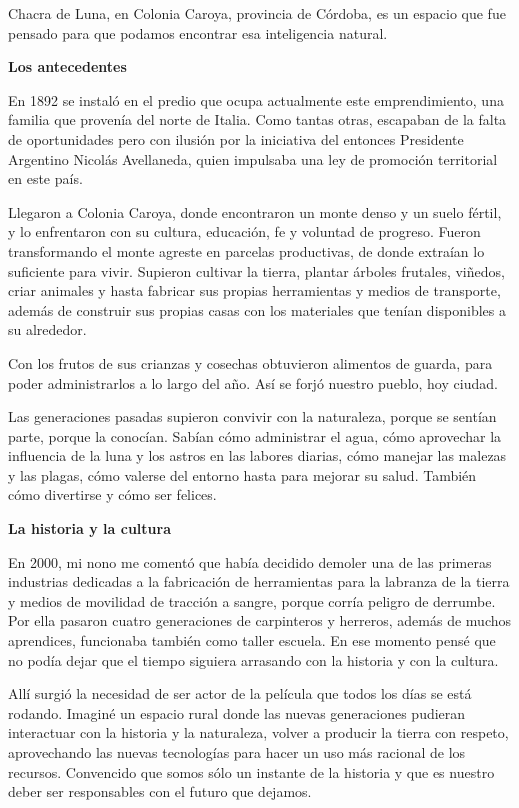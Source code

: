 Chacra de Luna, en Colonia Caroya, provincia de Córdoba, es un espacio
que fue pensado para que podamos encontrar esa inteligencia natural.

\textbf{Los antecedentes}

En 1892 se instaló en el predio que ocupa actualmente este
emprendimiento, una familia que provenía del norte de Italia. Como
tantas otras, escapaban de la falta de oportunidades pero con ilusión
por la iniciativa del entonces Presidente Argentino Nicolás Avellaneda,
quien impulsaba una ley de promoción territorial en este país.

Llegaron a Colonia Caroya, donde encontraron un monte denso y un suelo
fértil, y lo enfrentaron con su cultura, educación, fe y voluntad de
progreso. Fueron transformando el monte agreste en parcelas productivas,
de donde extraían lo suficiente para vivir. Supieron cultivar la tierra,
plantar árboles frutales, viñedos, criar animales y hasta fabricar sus
propias herramientas y medios de transporte, además de construir sus
propias casas con los materiales que tenían disponibles a su alrededor.

Con los frutos de sus crianzas y cosechas obtuvieron alimentos de
guarda, para poder administrarlos a lo largo del año. Así se forjó
nuestro pueblo, hoy ciudad.

Las generaciones pasadas supieron convivir con la naturaleza, porque se
sentían parte, porque la conocían. Sabían cómo administrar el agua, cómo
aprovechar la influencia de la luna y los astros en las labores diarias,
cómo manejar las malezas y las plagas, cómo valerse del entorno hasta
para mejorar su salud. También cómo divertirse y cómo ser felices.

\textbf{La historia y la cultura}

En 2000, mi nono me comentó que había decidido demoler una de las
primeras industrias dedicadas a la fabricación de herramientas para la
labranza de la tierra y medios de movilidad de tracción a sangre, porque
corría peligro de derrumbe. Por ella pasaron cuatro generaciones de
carpinteros y herreros, además de muchos aprendices, funcionaba también
como taller escuela. En ese momento pensé que no podía dejar que el
tiempo siguiera arrasando con la historia y con la cultura.

Allí surgió la necesidad de ser actor de la película que todos los días
se está rodando. Imaginé un espacio rural donde las nuevas generaciones
pudieran interactuar con la historia y la naturaleza, volver a producir
la tierra con respeto, aprovechando las nuevas tecnologías para hacer un
uso más racional de los recursos. Convencido que somos sólo un instante
de la historia y que es nuestro deber ser responsables con el futuro que
dejamos.

